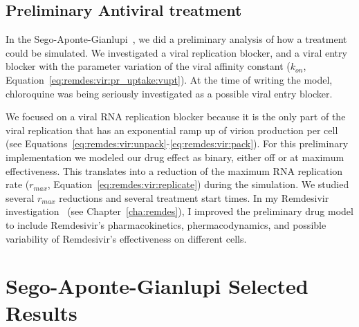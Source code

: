 \subsection{Preliminary Antiviral treatment}\label{sec:sego-aponte:prelim}

In the Sego-Aponte-Gianlupi~\cite{sego_modular_2020}, we did a preliminary analysis of how a treatment could be simulated. We investigated a viral replication blocker, and a viral entry blocker with the parameter variation of the viral affinity constant ($k_{on}$, Equation~\ref{eq:remdes:vir:pr_uptake:vupt}). At the time of writing the model, chloroquine was being seriously investigated as a possible viral entry blocker.

We focused on a viral RNA replication blocker because it is the only part of the viral replication that has an exponential ramp up of virion production per cell (see Equations~\ref{eq:remdes:vir:unpack}-\ref{eq:remdes:vir:pack}). For this preliminary implementation we modeled our drug effect as binary, either off or at maximum effectiveness. This translates into a reduction of the maximum RNA replication rate ($r_{max}$, Equation~\ref{eq:remdes:vir:replicate}) during the simulation. We studied several $r_{max}$ reductions and several treatment start times. In my Remdesivir investigation~\cite{ferrari_gianlupi_multiscale_2022} (see Chapter~\ref{cha:remdes}), I improved the preliminary drug model to include Remdesivir's pharmacokinetics, phermacodynamics, and possible variability of Remdesivir's effectiveness on different cells.


\section{Sego-Aponte-Gianlupi Selected Results}\label{sec:sego-aponte:results}


